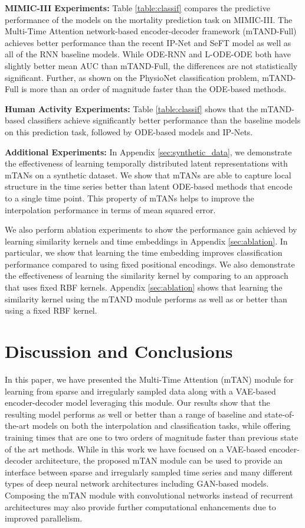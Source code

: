 \documentclass{article} \usepackage{iclr2021_conference,times}
\begin{document}
\textbf{MIMIC-III Experiments:}
Table \ref{table:classif} compares the  predictive performance of the models on the mortality prediction task on MIMIC-III.  The Multi-Time Attention network-based encoder-decoder framework (mTAND-Full) achieves better performance than the recent IP-Net and SeFT model as well as all of the RNN baseline models. While 
ODE-RNN and L-ODE-ODE both have slightly better mean AUC than mTAND-Full, the differences are not statistically significant. Further, as shown on the PhysioNet classification problem, mTAND-Full is more than an order of magnitude faster than the ODE-based methods.

\textbf{Human Activity Experiments:}
Table \ref{table:classif} shows that the mTAND-based classifiers achieve significantly better performance than the baseline models on this prediction task, followed by ODE-based models and IP-Nets. 

\textbf{Additional Experiments:} In Appendix \ref{sec:synthetic_data}, we demonstrate the effectiveness of learning  temporally distributed latent representations with mTANs on a synthetic dataset. We show that mTANs are able to capture local structure in the time series better than latent ODE-based methods that encode to a single time point. This property of mTANs helps to improve the interpolation performance in terms of mean squared error.

We also perform ablation experiments to show the performance gain achieved by learning similarity kernels and time embeddings in Appendix \ref{sec:ablation}. In particular, we show that learning the time embedding improves classification performance compared to using fixed positional encodings. We also demonstrate the effectiveness of learning the similarity kernel by comparing to an approach that uses fixed RBF kernels. Appendix \ref{sec:ablation} shows that  learning the similarity kernel using the mTAND module performs as well as or better than using a fixed RBF kernel.
 \section{Discussion and Conclusions}

In this paper, we have presented the Multi-Time Attention (mTAN) module for learning from sparse and irregularly sampled data along with a VAE-based encoder-decoder model leveraging this module. Our results show that the resulting model performs as well or better than a range of baseline and state-of-the-art models on both the interpolation and classification tasks, while offering training times that are one to two orders of magnitude faster than previous state of the art methods. 
While in this work we have focused on a VAE-based encoder-decoder architecture, the proposed mTAN module can be used to provide an interface between sparse and irregularly sampled time series and many different types of deep neural network architectures including GAN-based models. Composing the mTAN module with convolutional networks instead of recurrent architectures may also provide further computational enhancements due to improved parallelism.  

\appendix
\clearpage
\end{document}
